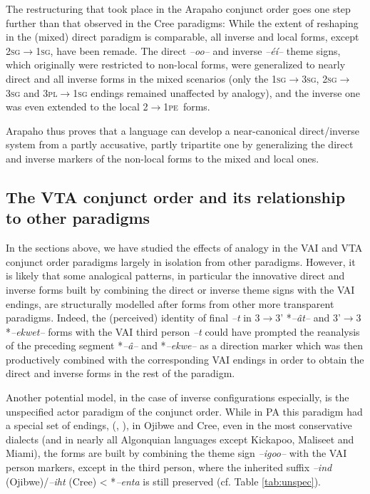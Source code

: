 \documentclass[twoside,a4paper,11pt]{article}
\newcommand{\ipa}[1]{{\phon\textit{#1}}}
\newcommand{\sg}{\textsc{sg}}
\newcommand{\pl}{\textsc{pl}}
\newcommand{\Σ}{\greek{Σ}}
\newcommand{\pe}{\textsc{pe}}
\begin{document}
The restructuring that took place in the Arapaho conjunct order goes one step further than that observed in the Cree paradigms: While the extent of reshaping in the (mixed) direct paradigm is comparable, all inverse and local forms, except 2\sg{}$\rightarrow$1\sg{}, have been remade. The direct \ipa{--oo--} and inverse \ipa{--éí--} theme signs, which originally were restricted to non-local forms, were generalized to nearly direct and all inverse forms in the mixed scenarios (only the 1\sg{}$\rightarrow$3\sg{}, 2\sg{}$\rightarrow$3\sg{} and 3\pl{}$\rightarrow$1\sg{} endings remained unaffected by analogy), and the inverse one was even extended to the local 2$\rightarrow$1\pe\ forms.

Arapaho thus proves that a language can develop a near-canonical direct/inverse system from a partly accusative, partly tripartite one by generalizing the direct and inverse markers of the non-local forms to the mixed and local ones. 

\subsection{The VTA conjunct order and its relationship to other paradigms}
In the sections above, we have studied the effects of analogy in the VAI and VTA conjunct order paradigms largely in isolation from other paradigms. However, it is likely that some analogical patterns, in particular the innovative direct and inverse forms built by combining the direct or inverse theme signs with the VAI endings, are structurally modelled after forms from other more transparent paradigms. Indeed, the (perceived) identity of final  \ipa{--t}  in 3$\rightarrow$3' *\ipa{--ât--} and 3'$\rightarrow$3  *\ipa{--ekwet--} forms with the VAI third person \ipa{--t} could have prompted the reanalysis of the preceding segment *\ipa{--â--} and *\ipa{--ekwe--} as a direction marker which was then productively combined with the corresponding VAI endings in order to obtain the direct and inverse forms in the rest of the paradigm.

Another potential model, in the case of inverse configurations especially, is the unspecified actor paradigm of the conjunct order. While in PA this paradigm had a special set of endings, (\citealt[88]{goddard79comparative}, \citealt[156-7]{oxford14microparameters}), in Ojibwe and Cree, even in the most conservative dialects (and in nearly all Algonquian languages except Kickapoo, Maliseet and Miami), the forms are built by combining the theme sign \ipa{--igoo--} with the VAI person markers, except in the third person, where the inherited suffix \ipa{--ind} (Ojibwe)/\ipa{--iht} (Cree) < *\ipa{--enta} is still preserved (cf. Table \ref{tab:unspec}).
\end{document}
